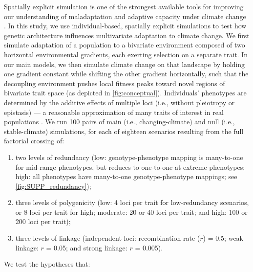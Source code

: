 \documentclass[9pt,twocolumn,twoside,lineno]{pnas-new}
\begin{document}
Spatially explicit simulation is one of the strongest available tools
for improving our understanding of maladaptation and adaptive capacity
under climate change \cite{capblancq_review}.
In this study, we use individual-based, spatially explicit simulations to test how genetic architecture influences multivariate adaptation to climate change.
We first simulate 
adaptation of a population to a bivariate environment composed of two horizontal 
environmental gradients, each exerting selection on a separate trait.
In our main models, we then simulate climate change on that landscape by holding one gradient 
constant while shifting the other gradient horizontally, such that
the decoupling environment pushes local fitness peaks toward novel regions 
of bivariate trait space (as depicted in \ref{fig:conceptual}).
Individuals' phenotypes are determined by the additive effects of multiple loci
(i.e., without pleiotropy or epistasis) ---
a reasonable approximation of many traits of interest in real populations \cite{sella}.
We run 100 pairs of main (i.e., changing-climate)
and null (i.e., stable-climate) simulations, for each of eighteen scenarios
resulting from the full factorial crossing of:
\begin{enumerate}
    \item two levels of redundancy (low: genotype-phenotype mapping is many-to-one for mid-range phenotypes, but reduces to one-to-one at extreme phenotypes; high: all phenotypes have many-to-one genotype-phenotype mappings; see \ref{fig:SUPP_redundancy});
    \item three levels of polygenicity (low: 4 loci per trait for low-redundancy scenarios, or 8 loci per trait for high; moderate: 20 or 40 loci per trait; and high: 100 or 200 loci per trait);
    \item three levels of linkage (independent loci: recombination rate ($r$) = 0.5; weak linkage: $r$ = 0.05; and strong linkage: $r$ = 0.005).
\end{enumerate}
We test the hypotheses that:
\end{document}
